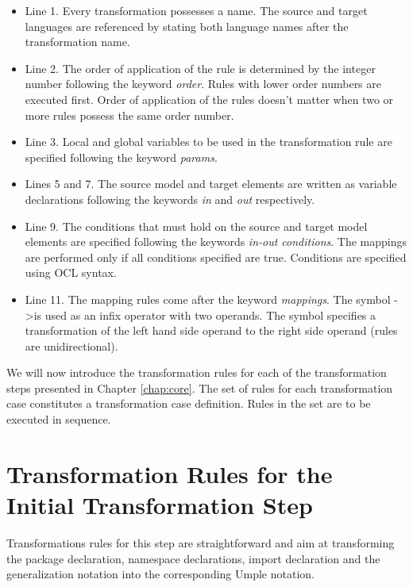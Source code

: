 \begin{itemize}

\item Line 1. Every transformation possesses a name. The source and target languages are referenced by stating both language names after the transformation name.

\item Line 2. The order of application of the rule is determined by the integer number following the keyword \textit{order}. Rules with lower order numbers are executed first. Order of application of the rules doesn't matter when two or more rules possess the same order number. 

\item Line 3. Local and global variables to be used in the transformation rule are specified following the keyword \textit{params}.

\item Lines 5 and 7. The source model and target elements are written as variable declarations following the keywords \textit{in} and \textit{out} respectively.

\item Line 9. The conditions that must hold on the source and target model elements are specified following the keywords \textit{in-out conditions}. The mappings are performed only if all conditions specified are true. Conditions are specified using OCL syntax. 

\item Line 11. The mapping rules come after the keyword \textit{mappings}. The symbol -\textgreater \newline is used as an infix operator with two operands. The symbol specifies a transformation of the left hand side operand to the right side operand (rules are unidirectional).
\end{itemize}

We will now introduce the transformation rules for each of the transformation steps presented in Chapter \ref{chap:core}.
The set of rules for each transformation case constitutes a transformation case definition. Rules in the set are to be executed in sequence.

\section{Transformation Rules for the Initial Transformation Step}

Transformations rules for this step are straightforward and aim at transforming the package declaration, namespace declarations, import declaration and the generalization notation into the corresponding Umple notation. 

